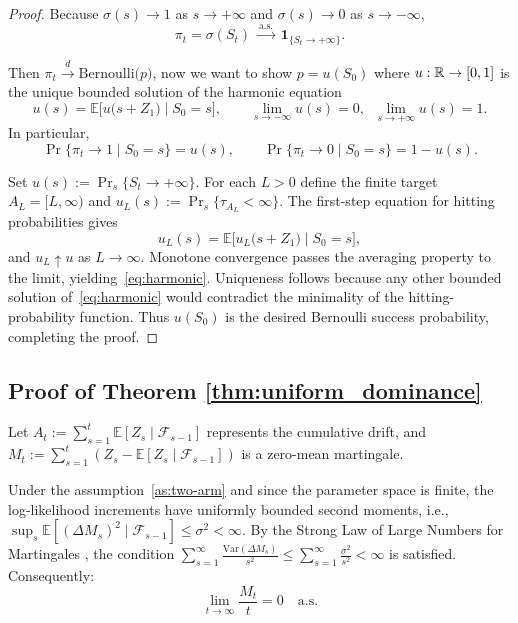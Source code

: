 \documentclass[12pt]{article}
\newcommand{\E}{\mathbb{E}}
\begin{document}
\begin{proof}
Because $\sigma(s)\to1$ as $s\to+\infty$ and $\sigma(s)\to0$ as $s\to-\infty$,
\[
\pi_t=\sigma(S_t)\;\xrightarrow{\text{a.s.}}\;
\mathbf 1_{\{S_t\to+\infty\}}.
\]

Then\/ $\pi_t\stackrel{d}{\longrightarrow}\mathrm{Bernoulli}\!\bigl(p\bigr)$, now we want to show $p = u(S_0)$ where
$u:\Bbb R\to[0,1]$ is the unique bounded solution of the harmonic equation
\begin{equation}\label{eq:harmonic}
u(s)=\E\bigl[u\!\bigl(s+Z_1\bigr)\mid S_0=s\bigr],\qquad
\lim_{s\to-\infty}u(s)=0,\;\;
\lim_{s\to+\infty}u(s)=1.
\end{equation}
In particular,
\[
\Pr\{\pi_t\to1\mid S_0=s\}=u(s),\qquad
\Pr\{\pi_t\to0\mid S_0=s\}=1-u(s).
\]

Set $u(s):=\Pr_s\{S_t\to+\infty\}$.
For each $L>0$ define the finite
target $A_L=[L,\infty)$ and $u_L(s):=\Pr_s\{\tau_{A_L}<\infty\}$.
The first-step equation for hitting probabilities
\citep{levin2017markov} gives
\[u_L(s)=\E\bigl[u_L\!\bigl(s+Z_1\bigr)\mid S_0=s\bigr],\]
and $u_L\uparrow u$ as $L\to\infty$.
Monotone convergence passes the averaging property to the limit,
yielding~\eqref{eq:harmonic}.
Uniqueness follows because any other bounded solution of~\eqref{eq:harmonic}
would contradict the minimality of the hitting-probability function.
Thus $u(S_0)$ is the desired Bernoulli success probability, completing the proof.
\end{proof}


\subsection{Proof of Theorem \ref{thm:uniform_dominance}}
\label{app:D:uniform_dominance_proof}

Let $A_t := \sum_{s=1}^{t} \mathbb{E}[Z_s \mid \mathcal{F}_{s-1}]$ represents the cumulative drift, and $M_t := \sum_{s=1}^t (Z_s - \mathbb{E}[Z_s \mid \mathcal{F}_{s-1}])$ is a zero-mean martingale.

Under the assumption~\ref{as:two-arm} and since the parameter space is finite, the log-likelihood increments have uniformly bounded second moments, i.e., $\sup_s \mathbb{E}[(\Delta M_s)^2 \mid \mathcal{F}_{s-1}] \leq \sigma^2 < \infty$. By the Strong Law of Large Numbers for Martingales \citep{chow1967strong}, the condition $\sum_{s=1}^\infty \frac{\text{Var}(\Delta M_s)}{s^2} \leq \sum_{s=1}^\infty \frac{\sigma^2}{s^2} < \infty$ is satisfied. Consequently:
\[
\lim_{t \to \infty} \frac{M_t}{t} = 0 \quad \text{a.s.}
\]
\end{document}
